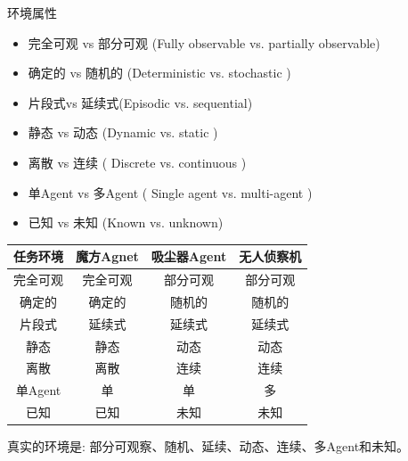 环境属性
\begin{itemize}
    \item 完全可观 vs 部分可观 (Fully observable vs. partially observable)
    \item 确定的 vs 随机的 (Deterministic vs. stochastic )
    \item 片段式vs 延续式(Episodic vs. sequential)
    \item 静态 vs 动态 (Dynamic vs. static )
    \item 离散 vs 连续 ( Discrete vs. continuous )
    \item 单Agent vs 多Agent ( Single agent vs. multi-agent )
    \item 已知 vs 未知 (Known vs. unknown)
\end{itemize}
\begin{table}[htbp]
    \centering
    \begin{tabular}{|c|ccc|}
      \hline
      任务环境 & 魔方Agnet & 吸尘器Agent & 无人侦察机 \bigstrut\\
      \hline
      完全可观 & 完全可观 & 部分可观 & 部分可观 \bigstrut[t]\\
      确定的 & 确定的 & 随机的 & 随机的 \\
      片段式 & 延续式 & 延续式 & 延续式 \\
      静态  & 静态  & 动态  & 动态 \\
      离散  & 离散  & 连续  & 连续 \\
      单Agent & 单   & 单   & 多 \\
      已知  & 已知  & 未知  & 未知 \bigstrut[b]\\
      \hline
    \end{tabular}%
\end{table}%

\begin{center}
    \colorbox{main1}{真实的环境是: 部分可观察、随机、延续、动态、连续、多Agent和未知。}
\end{center}
  
